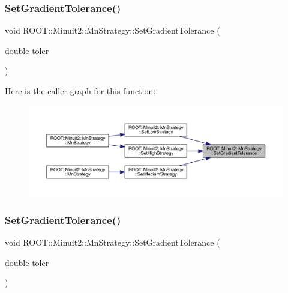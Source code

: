 \mbox{\label{classROOT_1_1Minuit2_1_1MnStrategy_aa7e6c4626962cd81e05821955ff562aa}} 
\subsubsection{\texorpdfstring{SetGradientTolerance()}{SetGradientTolerance()}\hspace{0.1cm}{\footnotesize\ttfamily [1/3]}}
{\footnotesize\ttfamily void R\+O\+O\+T\+::\+Minuit2\+::\+Mn\+Strategy\+::\+Set\+Gradient\+Tolerance (\begin{DoxyParamCaption}\item[{double}]{toler }\end{DoxyParamCaption})\hspace{0.3cm}{\ttfamily [inline]}}

Here is the caller graph for this function\+:
\nopagebreak
\begin{figure}[H]
\begin{center}
\leavevmode
\includegraphics[width=350pt]{da/de4/classROOT_1_1Minuit2_1_1MnStrategy_aa7e6c4626962cd81e05821955ff562aa_icgraph}
\end{center}
\end{figure}
\mbox{\label{classROOT_1_1Minuit2_1_1MnStrategy_aa7e6c4626962cd81e05821955ff562aa}} 
\subsubsection{\texorpdfstring{SetGradientTolerance()}{SetGradientTolerance()}\hspace{0.1cm}{\footnotesize\ttfamily [2/3]}}
{\footnotesize\ttfamily void R\+O\+O\+T\+::\+Minuit2\+::\+Mn\+Strategy\+::\+Set\+Gradient\+Tolerance (\begin{DoxyParamCaption}\item[{double}]{toler }\end{DoxyParamCaption})\hspace{0.3cm}{\ttfamily [inline]}}

